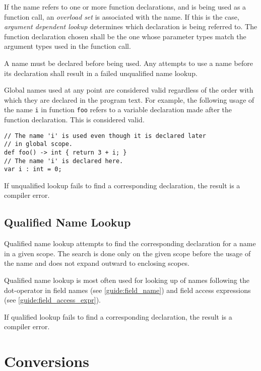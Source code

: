 If the name refers to one or more function declarations, and is being used as a function call, an \textit{overload set} is associated with the name. If this is the case, \textit{argument dependent lookup} determines which declaration is being referred to. The function declaration chosen shall be the one whose parameter types match the argument types used in the function call.

A name must be declared before being used. Any attempts to use a name before its declaration shall result in a failed unqualified name lookup.

Global names used at any point are considered valid regardless of the order with which they are declared in the program text. For example, the following usage of the name \texttt{i} in function \texttt{foo} refers to a variable declaration made after the function declaration. This is considered valid.

\begin{minip}
\begin{lstlisting}
// The name 'i' is used even though it is declared later
// in global scope.
def foo() -> int { return 3 + i; }
// The name 'i' is declared here.
var i : int = 0;
\end{lstlisting}
\end{minip}

If unqualified lookup fails to find a corresponding declaration, the result is a compiler error.

\subsection{Qualified Name Lookup} \label{guide:qlfd_lookup}

Qualified name lookup attempts to find the corresponding declaration for a name in a given scope. The search is done only on the given scope before the usage of the name and does not expand outward to enclosing scopes.

Qualified name lookup is most often used for looking up of names following the dot-operator in field names (see \ref{guide:field_name}) and field access expressions (see \ref{guide:field_access_expr}).

If qualified lookup fails to find a corresponding declaration, the result is a compiler error.

\section{Conversions} \label{guide:conversions}

